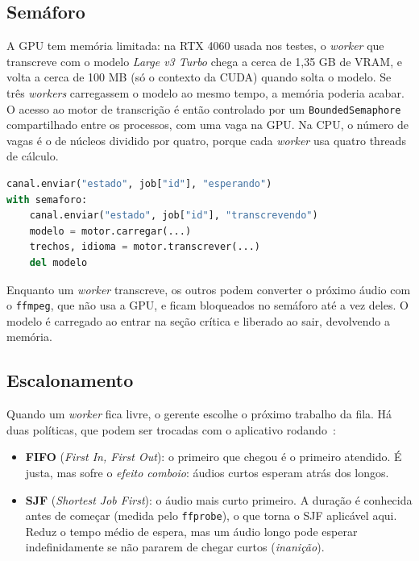 \documentclass[12pt,a4paper]{article}
\begin{document}
\subsection{Semáforo}
A GPU tem memória limitada: na RTX 4060 usada nos testes, o \emph{worker} que transcreve com
o modelo \emph{Large v3 Turbo} chega a cerca de 1,35 GB de VRAM, e volta a cerca de 100 MB
(só o contexto da CUDA) quando solta o modelo. Se três \emph{workers} carregassem o modelo ao mesmo tempo, a memória
poderia acabar. O acesso ao motor de transcrição é então controlado por um
\texttt{BoundedSemaphore} compartilhado entre os processos, com uma vaga na GPU. Na CPU, o
número de vagas é o de núcleos dividido por quatro, porque cada \emph{worker} usa quatro
threads de cálculo.

\begin{lstlisting}[language=Python]
canal.enviar("estado", job["id"], "esperando")
with semaforo:
    canal.enviar("estado", job["id"], "transcrevendo")
    modelo = motor.carregar(...)
    trechos, idioma = motor.transcrever(...)
    del modelo
\end{lstlisting}

Enquanto um \emph{worker} transcreve, os outros podem converter o próximo áudio com o
\texttt{ffmpeg}, que não usa a GPU, e ficam bloqueados no semáforo até a vez deles. O modelo
é carregado ao entrar na seção crítica e liberado ao sair, devolvendo a memória.

\subsection{Escalonamento}
Quando um \emph{worker} fica livre, o gerente escolhe o próximo trabalho da fila. Há duas
políticas, que podem ser trocadas com o aplicativo rodando~\cite{silberschatz}:

\begin{itemize}
  \item \textbf{FIFO} (\emph{First In, First Out}): o primeiro que chegou é o primeiro atendido.
        É justa, mas sofre o \emph{efeito comboio}: áudios curtos esperam atrás dos longos.
  \item \textbf{SJF} (\emph{Shortest Job First}): o áudio mais curto primeiro. A duração é
        conhecida antes de começar (medida pelo \texttt{ffprobe}), o que torna o SJF
        aplicável aqui. Reduz o tempo médio de espera, mas um áudio longo pode esperar
        indefinidamente se não pararem de chegar curtos (\emph{inanição}).
\end{itemize}
\end{document}
